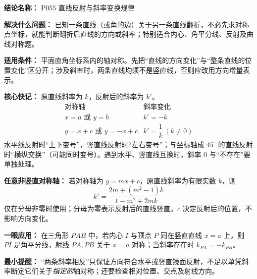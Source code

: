 \textbf{结论名称：} P055 直线反射与斜率变换规律

\textbf{解决什么问题：} 已知一条直线（或角的边）关于另一条直线翻折，不必先求对称点坐标，就能判断翻折后直线的方向或斜率；特别适合内心、角平分线、反射及曲线对称题。

\textbf{适用条件：} 平面直角坐标系内的轴对称。先把“直线的方向变化”与“整条直线的位置变化”区分开；涉及斜率时，两条直线均须不是竖直线，否则应改用方向增量表示。

\textbf{核心快记：} 原直线斜率为 $k$，反射后的斜率为 $k'$。
\[
\boxed{\begin{array}{c|c}
\text{对称轴}&\text{斜率变化}\\ \hline
x=a\text{ 或 }y=b&k'=-k\\
y=x+c\text{ 或 }y=-x+c&k'=\dfrac1k\ (k\ne0)
\end{array}}
\]
水平线反射时“上下变号”，竖直线反射时“左右变号”；与坐标轴成 $45^\circ$ 的直线反射时“横纵交换”（可能同时变号）。遇到水平、竖直线互换时，斜率 $0$ 与“不存在”要单独处理。

\textbf{任意非竖直对称轴：} 若对称轴为 $y=mx+c$，原直线斜率为有限实数 $k$，则
\[
\boxed{k'=\frac{2m+(m^2-1)k}{1-m^2+2mk}}
\]
仅在分母非零时使用；分母为零表示反射后的直线竖直。$c$ 决定反射后的位置，不影响方向变化。

\textbf{一眼应用：} 在三角形 $PAB$ 中，若内心 $I$ 与顶点 $P$ 同在竖直直线 $x=a$ 上，则 $PI$ 是角平分线，射线 $PA,PB$ 关于 $x=a$ 对称；当斜率存在时 $k_{PA}=-k_{PB}$。

\textbf{最小提醒：} “两条斜率相反”只保证方向符合水平或竖直镜面反射，不足以单凭斜率断定它们关于\emph{指定的}轴对称；还要检查相对位置、交点及射线方向。
